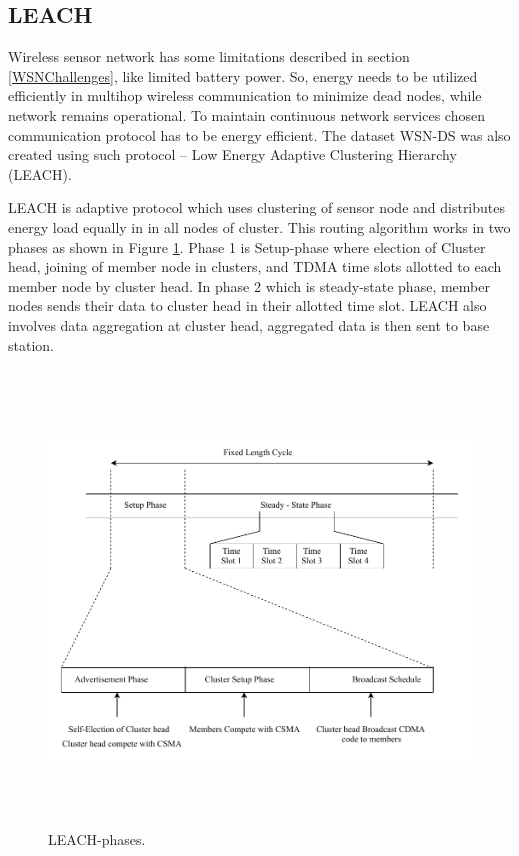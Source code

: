     \subsection{LEACH} \label{SSLeach}
    Wireless sensor network has some limitations described in section \ref{WSNChallenges}, like limited battery power. So, energy needs to be utilized efficiently in multihop wireless communication to minimize dead nodes, while network remains operational. To maintain continuous network services chosen communication protocol has to be energy efficient. The dataset WSN-DS was also created using such protocol – Low Energy Adaptive Clustering Hierarchy (LEACH). 
    \par LEACH \cite{palan2017low} is adaptive protocol which uses clustering of sensor node and distributes energy load equally in in all nodes of cluster. This routing algorithm works in two phases as shown in Figure \ref{LeachPhases}. Phase 1 is Setup-phase where election of Cluster head, joining of member node in clusters, and TDMA time slots allotted to each member node by cluster head. In phase 2 which is steady-state phase, member nodes sends their data to cluster head in their allotted time slot. LEACH also involves data aggregation at cluster head, aggregated data is then sent to base station.
    \begin{figure}[htb]
    \center	
    \includegraphics[width=5.5in, height=4.75in] {Figures/PDF/LeachPhases.pdf}
    \caption{LEACH-phases.}
    \label{LeachPhases}	
    \end{figure}
    
